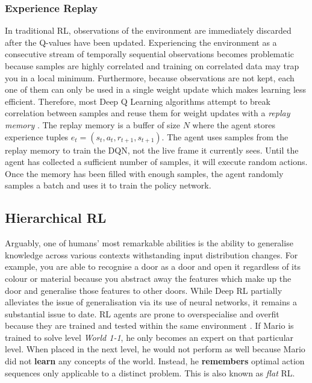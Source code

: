 \documentclass[notitlepage,a4paper,11pt]{article}
\begin{document}

\subsubsection{Experience Replay}
In traditional RL, observations of the environment are immediately discarded after the Q-values have been updated. Experiencing the environment as a consecutive stream of temporally sequential observations becomes problematic because samples are highly correlated and training on correlated data may trap you in a local minimum. Furthermore, because observations are not kept, each one of them can only be used in a single weight update which makes learning less efficient. Therefore, most Deep Q Learning algorithms attempt to break correlation between samples and reuse them for weight updates with a \textit{replay memory} \cite{lin1993reinforcement}. The replay memory is a buffer of size $N$ where the agent stores experience tuples $e_t = (s_t, a_t, r_{t+1}, s_{t+1})$. The agent uses samples from the replay memory to train the DQN, not the live frame it currently sees. Until the agent has collected a sufficient number of samples, it will execute random actions. Once the memory has been filled with enough samples, the agent randomly samples a batch and uses it to train the policy network. 


\subsection{Hierarchical RL}
Arguably, one of humans' most remarkable abilities is the ability to generalise knowledge \cite{geirhos2018generalisation} across various contexts withstanding input distribution changes. For example, you are able to recognise a door as a door and open it regardless of its colour or material because you abstract away the features which make up the door and generalise those features to other doors. While Deep RL partially alleviates the issue of generalisation via its use of neural networks\cite{sutton1996generalization}, it remains a substantial issue \cite{van2017hybrid} to date. RL agents are prone to overspecialise and overfit because they are trained and tested within the same environment \cite{cobbe2018quantifying}. If Mario is trained to solve level \textit{World 1-1}, he only becomes an expert on that particular level. When placed in the next level, he would not perform as well because Mario did not \textbf{learn} any concepts of the world. Instead, he \textbf{remembers} optimal action sequences only applicable to a distinct problem. This is also known as \textit{flat} RL.
\end{document}
